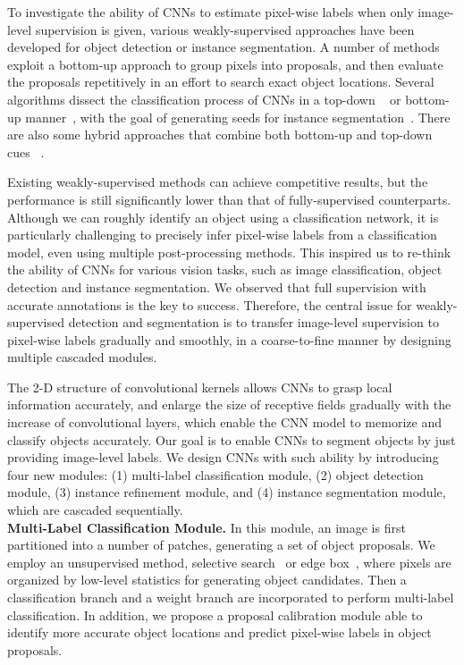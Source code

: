 \documentclass[10pt,twocolumn,letterpaper]{article}
\begin{document}
To investigate the ability of CNNs to estimate pixel-wise labels when only image-level supervision is given, various weakly-supervised approaches have been developed for object detection or instance segmentation. A number of methods~\cite{bilen2016weakly,tang2017multiple,tang2018weakly} exploit a bottom-up approach to group pixels into proposals, and then evaluate the proposals repetitively in an effort to search exact object locations. Several algorithms dissect the classification process of CNNs in a top-down ~\cite{zhang2016top,lapuschkin2016analyzing} or bottom-up manner~\cite{zhou2016learning}, with the goal of generating seeds for instance segmentation~\cite{zhou2018weakly}. There are also some hybrid approaches that combine both bottom-up and top-down cues ~\cite{roy2017combining,ge2018multi}.



Existing weakly-supervised methods can achieve competitive results, but the performance is still significantly lower than that of fully-supervised counterparts. Although we can roughly identify an object using a classification network, it is particularly challenging to precisely infer pixel-wise labels from a classification model, even using multiple post-processing methods. This inspired us to re-think the ability of CNNs for various vision tasks, such as image classification, object detection and instance segmentation. We observed that full supervision with accurate annotations is the key to success. Therefore, the central issue for weakly-supervised detection and segmentation is to transfer image-level supervision to pixel-wise labels gradually and smoothly, in a coarse-to-fine manner by designing multiple cascaded modules.

The 2-D structure of convolutional kernels allows CNNs to grasp local information accurately, and enlarge the size of receptive fields gradually with the increase of convolutional layers, which enable the CNN model to memorize and classify objects accurately. Our goal is to enable CNNs to segment objects by just providing image-level labels. We design CNNs with such ability by introducing four new modules: (1) multi-label classification module, (2) object detection module, (3) instance refinement module, and (4) instance segmentation module, which are cascaded sequentially. \\







\noindent\textbf{Multi-Label Classification Module.} In this module, an image is first partitioned into a number of patches, generating a set of object proposals. We employ an unsupervised method, selective search~\cite{uijlings2013selective} or edge box~\cite{zitnick2014edge}, where pixels are organized by low-level statistics for generating object candidates.
Then a classification branch and a weight branch are incorporated to perform multi-label classification. In addition, we propose a proposal calibration module able to identify more accurate object locations and predict pixel-wise labels in object proposals.\\
\end{document}
